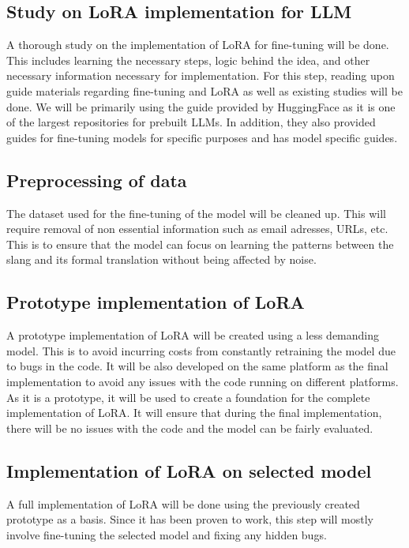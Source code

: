 \subsection{Study on LoRA implementation for LLM}
A thorough study on the implementation of LoRA for fine-tuning will be done.
This includes learning the necessary steps, logic behind the idea, and other necessary information necessary for implementation.
For this step, reading upon guide materials regarding fine-tuning and LoRA as well as existing studies will be done.
We will be primarily using the guide provided by HuggingFace as it is one of the largest repositories for prebuilt LLMs.
In addition, they also provided guides for fine-tuning models for specific purposes and has model specific guides.

\subsection{Preprocessing of data} 
The dataset used for the fine-tuning of the model will be cleaned up.
This will require removal of non essential information such as email adresses, URLs, etc.
This is to ensure that the model can focus on learning the patterns between the slang and its formal translation without being affected by noise.

\subsection{Prototype implementation of LoRA}
A prototype implementation of LoRA will be created using a less demanding model.
This is to avoid incurring costs from constantly retraining the model due to bugs in the code.
It will be also developed on the same platform as the final implementation to avoid any issues with the code running on different platforms.
As it is a prototype, it will be used to create a foundation for the complete implementation of LoRA.
It will ensure that during the final implementation, there will be no issues with the code and the model can be fairly evaluated.

\subsection{Implementation of LoRA on selected model}
A full implementation of LoRA will be done using the previously created prototype as a basis.
Since it has been proven to work, this step will mostly involve fine-tuning the selected model and fixing any hidden bugs.

